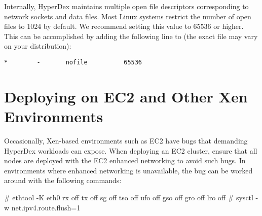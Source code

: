 Internally, HyperDex maintains multiple open file descriptors corresponding to
network sockets and data files.  Most Linux systems restrict the number of open
files to 1024 by default.  We recommend setting this value to 65536 or higher.
This can be accomplished by adding the following line to
 (the exact file may vary on your distribution):

\begin{verbatim}
*        -       nofile          65536
\end{verbatim}

\section{Deploying on EC2 and Other Xen Environments}

Occasionally, Xen-based environments such as EC2 have bugs that demanding
HyperDex workloads can expose.  When deploying an EC2 cluster, ensure that all
nodes are deployed with the EC2 enhanced networking to avoid such bugs.  In
environments where enhanced networking is unavailable, the bug can be worked
around with the following commands:

\begin{consolecode}
# ethtool -K eth0 rx off tx off sg off tso off ufo off gso off gro off lro off
# sysctl -w net.ipv4.route.flush=1
\end{consolecode}
